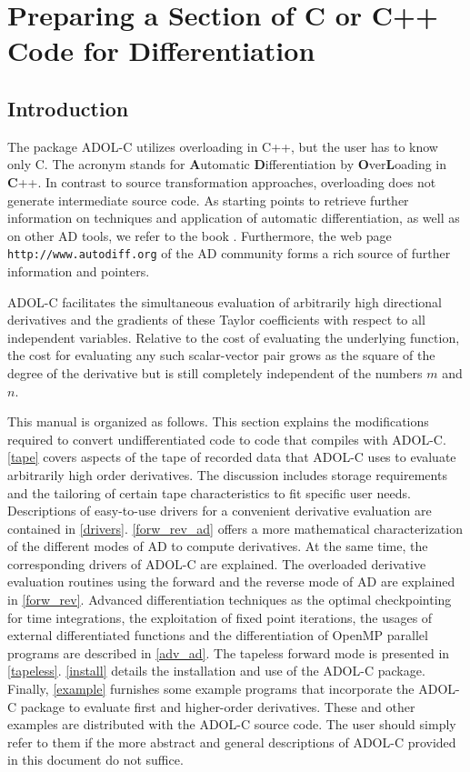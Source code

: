 \documentclass[11pt,twoside]{article}
\begin{document}
\newpage
%
%
\section{Preparing a Section of C or C++ Code for Differentiation}
\label{prepar}
%
\subsection{Introduction}
%
\setcounter{equation}{0}
The package \mbox{ADOL-C} 
utilizes overloading in C++, but the
user has to know only C. The acronym stands for {\bf A}utomatic 
{\bf D}ifferentiation by {\bf O}ver{\bf L}oading in {\bf C}++.
In contrast to source transformation approaches, overloading does not generate intermediate
source code. 
As starting points to retrieve further information on techniques and
application of automatic differentiation, as well as on other AD
tools, we refer to the book \cite{GrWa08}. Furthermore, the web page
\verb=http://www.autodiff.org= of the AD community forms a rich source
of further information and pointers.


ADOL-C facilitates the simultaneous
evaluation of arbitrarily high directional derivatives and the
gradients of these Taylor coefficients with respect to all independent
variables. Relative to the cost of evaluating the underlying function, 
the cost for evaluating any such scalar-vector pair grows as the
square of the degree of the derivative but is still completely
independent of the numbers $m$ and $n$. 

This manual is organized as follows. This section explains the 
modifications required to convert undifferentiated code to code that 
compiles with ADOL-C. 
\autoref{tape} covers aspects of the tape of recorded data that ADOL-C uses to
evaluate arbitrarily high order derivatives. The discussion includes storage 
requirements and the tailoring of certain tape characteristics to fit specific
user needs. Descriptions of easy-to-use drivers for a  convenient derivative 
evaluation are contained in \autoref{drivers}. 
\autoref{forw_rev_ad} offers a more mathematical characterization of
the different modes of AD to compute derivatives. At the same time, the
corresponding drivers of ADOL-C are explained.  
The overloaded derivative evaluation routines using the forward and the reverse
mode of AD are explained in \autoref{forw_rev}. 
Advanced differentiation techniques as the optimal checkpointing for
time integrations, the exploitation of fixed point iterations, the usages
of external differentiated functions and the differentiation of OpenMP
parallel programs are described in \autoref{adv_ad}. 
The tapeless forward mode is presented in \autoref{tapeless}.
\autoref{install} details the installation and 
use of the ADOL-C package. Finally, \autoref{example} 
furnishes some example programs that incorporate the ADOL-C package to 
evaluate first and higher-order
derivatives.  These and other examples are distributed with the ADOL-C
source code.
The user should simply refer to them if the more abstract and general 
descriptions of ADOL-C provided in this document do not suffice.
%
\end{document}
